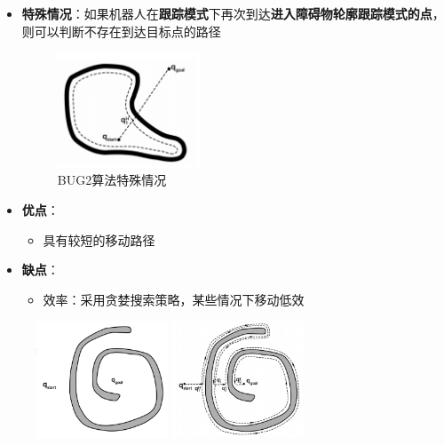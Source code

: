 \documentclass[../main.tex]{subfiles}
\begin{document}
\begin{enumerate}
\begin{enumerate}
\begin{itemize}
                    \item \textbf{特殊情况}：如果机器人在\textbf{跟踪模式}下再次到达\textbf{进入障碍物轮廓跟踪模式的点}，则可以判断不存在到达目标点的路径
                        \begin{figure}[H]
                            \centering
                            \includegraphics[width=0.4\textwidth]{images/bug2sp.png}
                            \caption{BUG2算法特殊情况}
                        \end{figure}                   
                    \item \textbf{优点}：
                        \begin{itemize}
                            \item 具有较短的移动路径
                        \end{itemize}
                    \item \textbf{缺点}：
                        \begin{itemize}
                            \item 效率：采用贪婪搜索策略，某些情况下移动低效
                        \end{itemize}
                \end{itemize}
                \begin{figure}[htbp]
                    \centering
                    \includegraphics[width=0.35\textwidth]{images/bug2bad.png}
                    \includegraphics[width=0.35\textwidth]{images/bug2bad2.png}

\end{figure}
\end{enumerate}
\end{enumerate}
\end{document}
